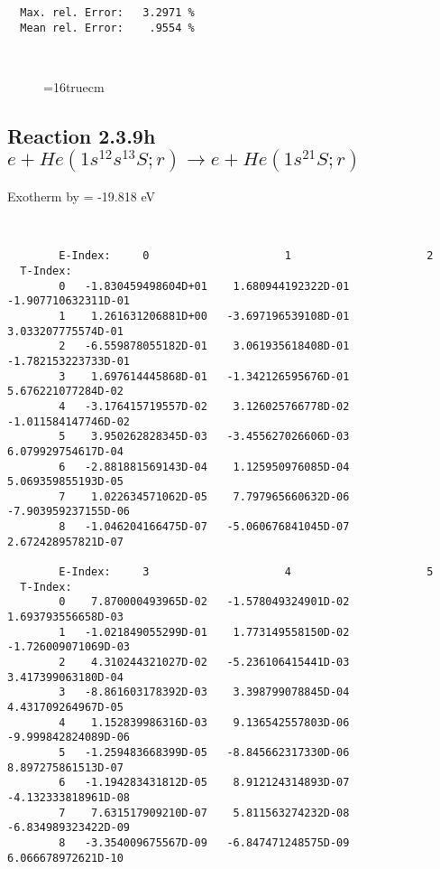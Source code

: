\documentclass[12pt,dvipdfmx]{article}
\begin{document}
\begin{small}
\begin{verbatim}
  Max. rel. Error:   3.2971 %
  Mean rel. Error:    .9554 %



\end{verbatim}\end{small}
\begin{figure} \label{2.3.9g}
\epsfxsize=16truecm
\end{figure}
\newpage

\subsection{
Reaction 2.3.9h  $e + He(1s^12s^13S;r) \rightarrow e + He(1s^21S;r) $
}
Exotherm by =  -19.818 eV

\begin{small}\begin{verbatim}


        E-Index:     0                     1                     2
  T-Index:
        0   -1.830459498604D+01    1.680944192322D-01   -1.907710632311D-01
        1    1.261631206881D+00   -3.697196539108D-01    3.033207775574D-01
        2   -6.559878055182D-01    3.061935618408D-01   -1.782153223733D-01
        3    1.697614445868D-01   -1.342126595676D-01    5.676221077284D-02
        4   -3.176415719557D-02    3.126025766778D-02   -1.011584147746D-02
        5    3.950262828345D-03   -3.455627026606D-03    6.079929754617D-04
        6   -2.881881569143D-04    1.125950976085D-04    5.069359855193D-05
        7    1.022634571062D-05    7.797965660632D-06   -7.903959237155D-06
        8   -1.046204166475D-07   -5.060676841045D-07    2.672428957821D-07

        E-Index:     3                     4                     5
  T-Index:
        0    7.870000493965D-02   -1.578049324901D-02    1.693793556658D-03
        1   -1.021849055299D-01    1.773149558150D-02   -1.726009071069D-03
        2    4.310244321027D-02   -5.236106415441D-03    3.417399063180D-04
        3   -8.861603178392D-03    3.398799078845D-04    4.431709264967D-05
        4    1.152839986316D-03    9.136542557803D-06   -9.999842824089D-06
        5   -1.259483668399D-05   -8.845662317330D-06    8.897275861513D-07
        6   -1.194283431812D-05    8.912124314893D-07   -4.132333818961D-08
        7    7.631517909210D-07    5.811563274232D-08   -6.834989323422D-09
        8   -3.354009675567D-09   -6.847471248575D-09    6.066678972621D-10


\end{verbatim}
\end{small}
\end{document}

